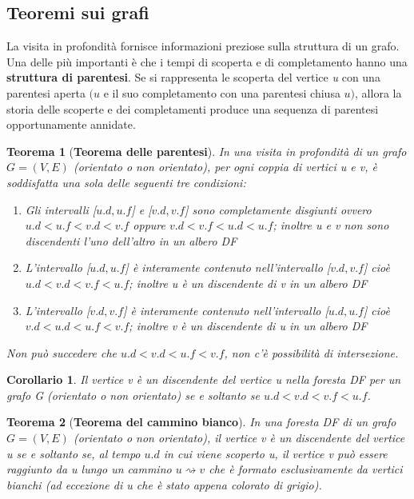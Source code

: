 \documentclass[10pt, a4paper]{report}
\newtheorem{theorem}{Teorema}[chapter]
\newtheorem{corollario}{Corollario}[chapter]
\begin{document}
\subsection{Teoremi sui grafi}
La visita in profondità fornisce informazioni preziose sulla struttura di un grafo. Una delle più importanti è che i tempi di scoperta e di completamento hanno una \textbf{struttura di parentesi}. Se si rappresenta le scoperta del vertice \textit{u} con una parentesi aperta $(u$ e il suo completamento con una parentesi chiusa $u)$, allora la storia delle scoperte e dei completamenti produce una sequenza di parentesi opportunamente annidate.
\begin{theorem}[\textbf{Teorema delle parentesi}]
In una visita in profondità di un grafo $G = (V,E)$ (orientato o non orientato), per ogni coppia di vertici \textit{u} e \textit{v}, è soddisfatta una sola delle seguenti tre condizioni:
\begin{enumerate}
\item Gli intervalli [$u.d, u.f$] e [$v.d, v.f$] sono completamente disgiunti ovvero $u.d < u.f < v.d < v.f$ oppure $v.d < v.f < u.d < u.f$; inoltre \textit{u} e \textit{v} non sono discendenti l'uno dell'altro in un albero DF
\item L'intervallo [$u.d, u.f$] è interamente contenuto nell'intervallo [$v.d, v.f$] cioè $u.d < v.d < v.f < u.f$; inoltre \textit{u} è un discendente di \textit{v} in un albero DF
\item L'intervallo [$v.d, v.f$] è interamente contenuto nell'intervallo [$u.d, u.f$] cioè $v.d < u.d < u.f < v.f$; inoltre \textit{v} è un discendente di \textit{u} in un albero DF
\end{enumerate}
Non può succedere che $u.d < v.d < u.f < v.f$, non c'è possibilità di intersezione.
\end{theorem}
\begin{corollario}
Il vertice \textit{v} è un discendente del vertice \textit{u} nella foresta DF per un grafo \textit{G} (orientato o non orientato) se e soltanto se $u.d < v.d < v.f < u.f$.
\end{corollario}
\begin{theorem}[\textbf{Teorema del cammino bianco}]
In una foresta DF di un grafo $G = (V,E)$ (orientato o non orientato), il vertice \textit{v} è un discendente del vertice \textit{u} se e soltanto se, al tempo $u.d$ in cui viene scoperto \textit{u}, il vertice \textit{v} può essere raggiunto da \textit{u} lungo un cammino $u \rightsquigarrow v$ che è formato esclusivamente da vertici bianchi (ad eccezione di \textit{u} che è stato appena colorato di grigio).
\end{theorem}
\end{document}
